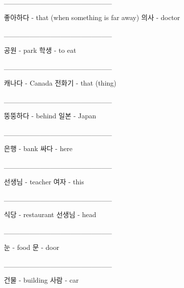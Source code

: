 \documentclass[addpoints, 30pt]{../exam}%
\begin{document}
\begin{questions}
\begin{choices}
\end{choices}%
\question[1]%
\_\_\_\_\_\_\_\_\_\_\_\_\_\_\_\_\_\_\_\_\_%
\begin{choices}%
\choice%
좋아하다 {-} that (when something is far away)%
\CorrectChoice%
의사 {-} doctor%
\end{choices}%
\question[1]%
\_\_\_\_\_\_\_\_\_\_\_\_\_\_\_\_\_\_\_\_\_%
\begin{choices}%
\CorrectChoice%
공원 {-} park%
\choice%
학생 {-} to eat%
\end{choices}%
\question[1]%
\_\_\_\_\_\_\_\_\_\_\_\_\_\_\_\_\_\_\_\_\_%
\begin{choices}%
\CorrectChoice%
캐나다 {-} Canada%
\choice%
전화기 {-} that (thing)%
\end{choices}%
\question[1]%
\_\_\_\_\_\_\_\_\_\_\_\_\_\_\_\_\_\_\_\_\_%
\begin{choices}%
\choice%
뚱뚱하다 {-} behind%
\CorrectChoice%
일본 {-} Japan%
\end{choices}%
\question[1]%
\_\_\_\_\_\_\_\_\_\_\_\_\_\_\_\_\_\_\_\_\_%
\begin{choices}%
\CorrectChoice%
은행 {-} bank%
\choice%
싸다 {-} here%
\end{choices}%
\question[1]%
\_\_\_\_\_\_\_\_\_\_\_\_\_\_\_\_\_\_\_\_\_%
\begin{choices}%
\CorrectChoice%
선생님 {-} teacher%
\choice%
여자 {-} this%
\end{choices}%
\question[1]%
\_\_\_\_\_\_\_\_\_\_\_\_\_\_\_\_\_\_\_\_\_%
\begin{choices}%
\CorrectChoice%
식당 {-} restaurant%
\choice%
선생님 {-} head%
\end{choices}%
\question[1]%
\_\_\_\_\_\_\_\_\_\_\_\_\_\_\_\_\_\_\_\_\_%
\begin{choices}%
\choice%
눈 {-} food%
\CorrectChoice%
문 {-} door%
\end{choices}%
\question[1]%
\_\_\_\_\_\_\_\_\_\_\_\_\_\_\_\_\_\_\_\_\_%
\begin{choices}%
\CorrectChoice%
건물 {-} building%
\choice%
사람 {-} car%
\end{choices}%
\end{questions}%
\end{document}
